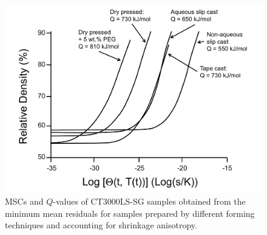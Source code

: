 \newpage
\begin{figure}[H]
	\centering
	\includegraphics[width=\textwidth]{Chapter-6/Figures/Figure6.png}
	\caption{MSCs and $Q$-values of CT3000LS-SG samples obtained from the minimum mean residuals for samples prepared by different forming techniques and accounting for shrinkage anisotropy.}
	\label{Ch6-figure:Figure6}
\end{figure}

